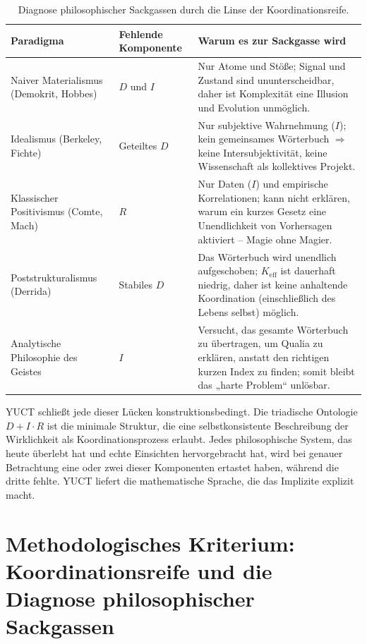 \documentclass[12pt,a4paper]{article}
\newcommand{\Keff}{K_{\mathrm{eff}}}
\begin{document}
	\begin{table}[htbp]
		\centering
		\caption{Diagnose philosophischer Sackgassen durch die Linse der Koordinationsreife.}
		\label{tab:dead-ends}
		\small
		\begin{tabular}{p{3cm} p{5.5cm} p{5.5cm}}
			\toprule
			\textbf{Paradigma} & \textbf{Fehlende Komponente} & \textbf{Warum es zur Sackgasse wird} \\
			\midrule
			Naiver Materialismus (Demokrit, Hobbes) & \(D\) und \(I\) & Nur Atome und Stöße; Signal und Zustand sind ununterscheidbar, daher ist Komplexität eine Illusion und Evolution unmöglich. \\
			Idealismus (Berkeley, Fichte) & Geteiltes \(D\) & Nur subjektive Wahrnehmung (\(I\)); kein gemeinsames Wörterbuch \(\Rightarrow\) keine Intersubjektivität, keine Wissenschaft als kollektives Projekt. \\
			Klassischer Positivismus (Comte, Mach) & \(R\) & Nur Daten (\(I\)) und empirische Korrelationen; kann nicht erklären, warum ein kurzes Gesetz eine Unendlichkeit von Vorhersagen aktiviert – Magie ohne Magier. \\
			Poststrukturalismus (Derrida) & Stabiles \(D\) & Das Wörterbuch wird unendlich aufgeschoben; \(\Keff\) ist dauerhaft niedrig, daher ist keine anhaltende Koordination (einschließlich des Lebens selbst) möglich. \\
			Analytische Philosophie des Geistes & \(I\) & Versucht, das gesamte Wörterbuch zu übertragen, um Qualia zu erklären, anstatt den richtigen kurzen Index zu finden; somit bleibt das „harte Problem“ unlösbar. \\
			\bottomrule
		\end{tabular}
	\end{table}
	
	YUCT schließt jede dieser Lücken konstruktionsbedingt. Die triadische Ontologie \(D + I \cdot R\) ist die minimale Struktur, die eine selbstkonsistente Beschreibung der Wirklichkeit als Koordinationsprozess erlaubt. Jedes philosophische System, das heute überlebt hat und echte Einsichten hervorgebracht hat, wird bei genauer Betrachtung eine oder zwei dieser Komponenten ertastet haben, während die dritte fehlte. YUCT liefert die mathematische Sprache, die das Implizite explizit macht.
	
	\section{Methodologisches Kriterium: Koordinationsreife und die Diagnose philosophischer Sackgassen}
	\label{sec:methodological-criterion}
	
\end{document}
